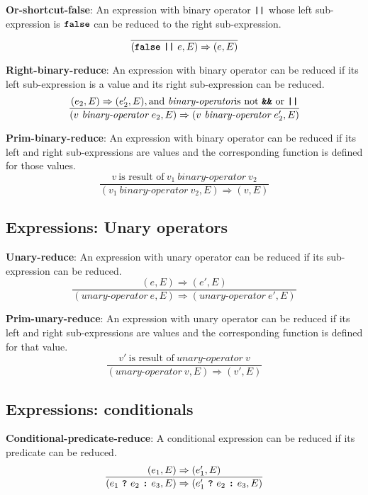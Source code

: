 \vspace{10mm}
\textbf{Or-shortcut-false}: An expression with binary operator
$\textbf{\texttt{||}}$ whose left sub-expression is
$\textbf{\texttt{false}}$ can be reduced to
the right sub-expression.
\[
\frac{
}{
  (\textbf{\texttt{false}}\  \textbf{\texttt{||}}\ e, E)
  \Rightarrow
  (e, E)
}
\]


\vspace{10mm}
\textbf{Right-binary-reduce}: An expression with binary operator
can be reduced if its left sub-expression is a value and its right
sub-expression can be reduced.
\[
\frac{
  ( e_2 , E ) \Rightarrow (e_2', E), \textrm{and}\ \textit{binary-operator}
  \mbox{is not}\ \textbf{\texttt{\&\&}}\ \textrm{or}\ \texttt{\textbf{||}}
}{
  (v\  \textit{binary-operator} \ e_2, E)
  \Rightarrow
  (v\  \textit{binary-operator} \ e_2', E)
}
\]

\vspace{10mm}
\textbf{Prim-binary-reduce}: An expression with binary operator
can be reduced if its left and right sub-expressions are values and
the corresponding function is defined for those values.
\[
\frac{
  v\ \mbox{is result of}\ v_1\  \textit{binary-operator} \ v_2
}{
  (v_1\  \textit{binary-operator} \ v_2, E)
  \Rightarrow
  (v, E)
}
\]

\subsection*{Expressions: Unary operators}

\textbf{Unary-reduce}: An expression with unary operator
can be reduced if its sub-expression can be reduced.
\[
\frac{
  ( e , E ) \Rightarrow (e', E)
}{
  (\textit{unary-operator} \ e, E)
  \Rightarrow
  (\textit{unary-operator} \ e', E)
}
\]

\vspace{10mm}
\textbf{Prim-unary-reduce}: An expression with unary operator
can be reduced if its left and right sub-expressions are values and
the corresponding function is defined for that value.
\[
\frac{
  v'\ \mbox{is result of}\ \textit{unary-operator} \ v
}{
  (\textit{unary-operator} \ v, E)
  \Rightarrow
  (v', E)
}
\]

\subsection*{Expressions: conditionals}

\textbf{Conditional-predicate-reduce}: A conditional
expression 
can be reduced if its predicate can be reduced.
\[
\frac{
  ( e_1 , E ) \Rightarrow (e_1', E)
}{
  (e_1\  \textbf{\texttt{?}}\ e_2\ \textbf{\texttt{:}}\ e_3, E)
  \Rightarrow
  (e_1'\ \textbf{\texttt{?}}\ e_2\ \textbf{\texttt{:}}\ e_3, E)
}
\]

